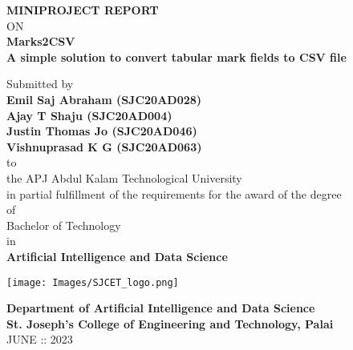 \thispagestyle{empty}
\begin{center}
 
{\normalsize \bf MINIPROJECT REPORT}\\
ON\\
\vspace*{0.2 cm}
{\huge \bf Marks2CSV}\\
{\normalsize \bf A simple solution to convert tabular mark fields to CSV file}

   \vspace{0.5 cm}
   \large Submitted by\\
   { \bf Emil Saj Abraham (SJC20AD028)}\\
   { \bf Ajay T Shaju (SJC20AD004)}\\
   { \bf Justin Thomas Jo (SJC20AD046)}\\
   { \bf Vishnuprasad K G (SJC20AD063)}\\[-0.6mm]
  {\large to\\[-0.6mm] the APJ Abdul Kalam Technological University\\[-0.6mm] in partial fulfillment of the requirements for the award of the degree\\[-0.6mm] of\\[-0.6mm] Bachelor of Technology\\[-0.6mm] in\\[-0.6mm] {\bf Artificial Intelligence and Data Science}}
  
   \begin{center}
   \texttt{[image: Images/SJCET\_logo.png]}
   \end{center}
   \vspace*{-0.5cm}
  {\LARGE {\bf Department of Artificial Intelligence and Data Science}}\\
          [-3mm] {\large {\bf St. Joseph's College of Engineering and Technology, Palai}\\
           [1mm] JUNE :: 2023}

\end{center}

\newpage

